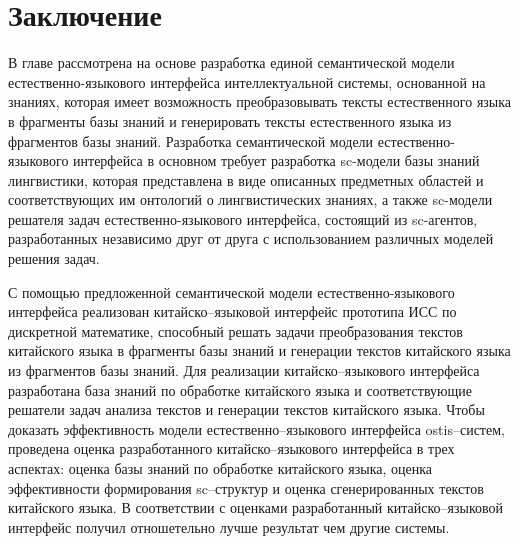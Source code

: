 \section {Заключение}
В главе рассмотрена на основе  разработка единой семантической модели естественно-языкового интерфейса интеллектуальной системы, основанной на знаниях, которая имеет возможность преобразовывать тексты естественного языка в фрагменты базы знаний и генерировать тексты естественного языка из фрагментов базы знаний. Разработка семантической модели естественно-языкового интерфейса в основном требует разработка sc-модели базы знаний лингвистики, которая представлена в виде описанных предметных областей и соответствующих им онтологий о лингвистических знаниях, а также sc-модели решателя задач естественно-языкового интерфейса, состоящий из sc-агентов, разработанных независимо друг от друга с использованием различных моделей решения задач.

С помощью предложенной семантической модели естественно-языкового интерфейса реализован китайско–языковой интерфейс прототипа ИСС по дискретной математике, способный решать задачи преобразования текстов китайского языка в фрагменты базы знаний и генерации текстов китайского языка из фрагментов базы знаний. Для реализации китайско–языкового интерфейса разработана база знаний по обработке китайского языка и соответствующие решатели задач анализа текстов и генерации текстов китайского языка. Чтобы доказать эффективность модели естественно–языкового интерфейса ostis–систем, проведена оценка разработанного китайско–языкового интерфейса в трех аспектах: оценка базы знаний по обработке китайского языка, оценка эффективности формирования sc–структур и оценка сгенерированных текстов китайского языка. В соответствии с оценками разработанный китайско–языковой интерфейс получил отношетельно лучше результат чем другие системы.
%